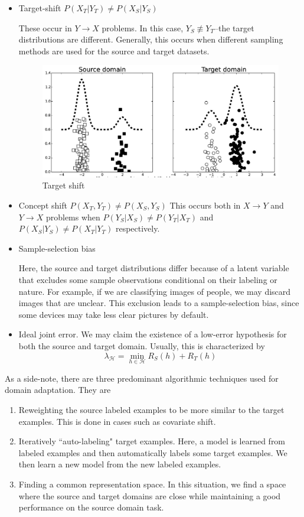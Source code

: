 \begin{itemize}
	
	\item Target-shift
	$P(X_T|Y_T)\neq P(X_S|Y_S)$
	
	These occur in $Y\to X$ problems. In this case, $Y_S\not\equiv Y_T$--the target distributions are different. Generally, this occurs when different sampling methods are used for the source and target datasets.
	
	\begin{figure}
		\centering
		\includegraphics[width=0.7\linewidth]{pictures/target_shift}
		\caption[Target shift illustration.]{Target shift}
		\label{fig:targetshift}
	\end{figure}
	
	\item Concept shift
	$P(X_T,Y_T)\neq P(X_S,Y_S)$ This occurs both in $X\to Y$ and $Y\to X$ problems when $P(Y_S|X_S)\neq P(Y_T|X_T)$ and $P(X_S|Y_S)\neq P(X_T|Y_T)$ respectively.
	\item Sample-selection bias
	
	Here, the source and target distributions differ because of a latent variable that excludes some sample observations conditional on their labeling or nature. For example, if we are classifying images of people, we may discard images that are unclear. This exclusion leads to a sample-selection bias, since some devices may take less clear pictures by default.
	
	\item Ideal joint error.
	We may claim the existence of a low-error hypothesis for both the source and target domain. Usually, this is characterized by
	\[
	\lambda_{\mathcal{H}}=\min_{h\in \mathcal{H}} R_S(h)+R_T(h)
	\]
	
\end{itemize}

As a side-note, there are three predominant algorithmic techniques used for domain adaptation. They are

\begin{enumerate}
	\item Reweighting the source labeled examples to be more similar to the target examples. This is done in cases such as covariate shift.
	\item Iteratively ``auto-labeling" target examples. Here, a model is learned from labeled examples and then automatically labels some target examples. We then learn a new model from the new labeled examples.
	\item Finding a common representation space. In this situation, we find a space where the source and target domains are close while maintaining a good performance on the source domain task.
\end{enumerate}

